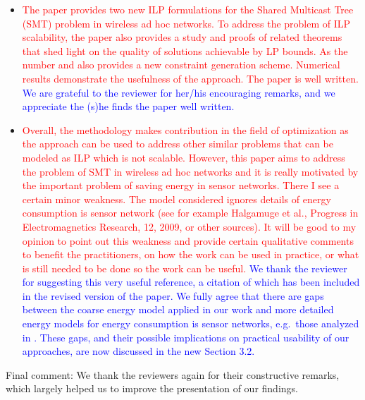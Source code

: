 \documentclass[12pt]{article}
\begin{document}
\begin{itemize}
\item \textcolor{red}{The paper provides two new ILP formulations for the Shared Multicast Tree (SMT) problem in wireless ad hoc networks.
To address the problem of ILP scalability, the paper also provides a study and proofs of related theorems that shed light on the quality of
solutions achievable by  LP  bounds.
As the number and also provides a new constraint generation scheme.
Numerical results demonstrate the usefulness of the approach. The paper is well written.} \textcolor{blue}{
We are grateful to the reviewer for her/his encouraging remarks, and we appreciate the (s)he finds the paper well written.
}
\item \textcolor{red}{Overall, the methodology makes contribution in the field of optimization as the approach can be used to address other similar problems
that can be modeled as ILP which is not scalable.
However, this paper aims to address the problem of SMT in wireless ad hoc networks and it is
really motivated by the important problem of saving energy in sensor networks.
There I see a certain minor weakness.
The model considered ignores details of energy consumption is sensor network
(see for example Halgamuge et al., Progress in Electromagnetics Research, 12, 2009, or other sources).
It will be good to my opinion to point out this weakness and provide certain qualitative comments to benefit the practitioners,
on how the work can be used in practice, or what is still needed to be done so the work can be useful.} \textcolor{blue}{
We thank the reviewer for suggesting this very useful reference, a citation of which has been included in the revised version of the paper.
We fully agree that there are gaps between the coarse energy model applied in our work and more detailed energy models for energy consumption is sensor networks,
e.g.\ those analyzed in \cite{halgamuge}.
These gaps, and their possible implications on practical usability of our approaches, are now discussed in the new Section 3.2.
}
\end{itemize}

\noindent
Final comment: We thank the reviewers again for their constructive remarks, which largely helped us to improve the presentation of our findings.
\end{document}
